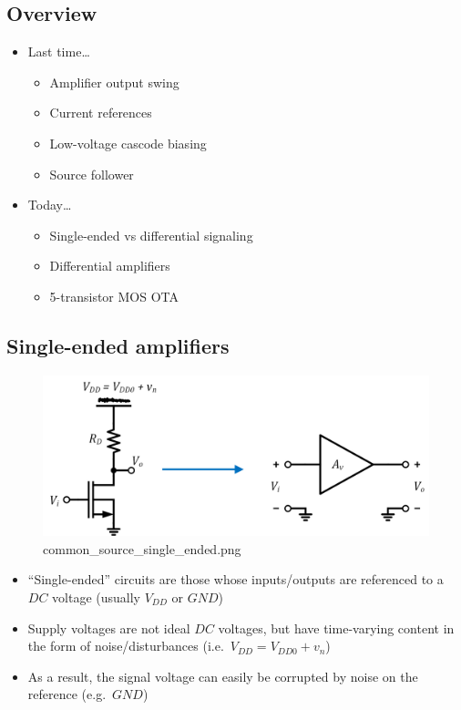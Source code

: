 \documentclass[11pt]{article}
\providecommand{\tightlist}{%
      \setlength{\itemsep}{0pt}\setlength{\parskip}{0pt}}
\begin{document}
    \hypertarget{overview}{%
\subsection{Overview}\label{overview}}

    \begin{itemize}
\tightlist
\item
  Last time\ldots{}

  \begin{itemize}
  \tightlist
  \item
    Amplifier output swing
  \item
    Current references
  \item
    Low-voltage cascode biasing
  \item
    Source follower
  \end{itemize}
\item
  Today\ldots{}

  \begin{itemize}
  \tightlist
  \item
    Single-ended vs differential signaling
  \item
    Differential amplifiers
  \item
    5-transistor MOS OTA
  \end{itemize}
\end{itemize}

    \hypertarget{single-ended-amplifiers}{%
\subsection{Single-ended amplifiers}\label{single-ended-amplifiers}}

    \begin{figure}
\centering
\includegraphics{common_source_single_ended.png}
\caption{common\_source\_single\_ended.png}
\end{figure}

    \begin{itemize}
\item
  ``Single-ended'' circuits are those whose inputs/outputs are
  referenced to a \(DC\) voltage (usually \(V_{DD}\) or \(GND\))
\item
  Supply voltages are not ideal \(DC\) voltages, but have time-varying
  content in the form of noise/disturbances
  (i.e.~\(V_{DD} = V_{DD0} + v_n\))
\item
  As a result, the signal voltage can easily be corrupted by noise on
  the reference (e.g.~\(GND\))
\end{itemize}
\end{document}
